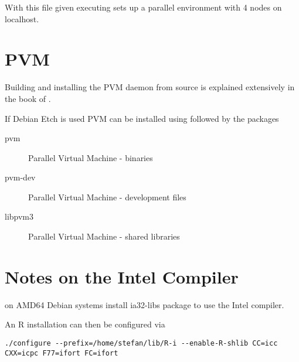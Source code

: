 With this file given executing  sets up a
parallel environment with 4 nodes on localhost.

\section{PVM}

Building and installing the PVM daemon from source is explained
extensively in the book of \cite{geist94pvm}.

If Debian Etch is used PVM can be installed using  followed by the packages

\begin{description}
\item[pvm] Parallel Virtual Machine - binaries 
\item[pvm-dev] Parallel Virtual Machine - development files
\item[libpvm3] Parallel Virtual Machine - shared libraries
\end{description}


\section{Notes on the Intel Compiler}

on AMD64 Debian systems install ia32-libs package to use the Intel
compiler.

An R installation can then be configured via

\begin{verbatim}
./configure --prefix=/home/stefan/lib/R-i --enable-R-shlib CC=icc
CXX=icpc F77=ifort FC=ifort
\end{verbatim}
